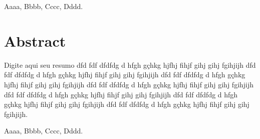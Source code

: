 \documentclass[12pt, a4paper, oneside]{book}
\begin{document}
 Aaaa, Bbbb, Cccc, Dddd.



\newpage
{}

\chapter*{Abstract}
\thispagestyle{myheadings}
\noindent
Digite aqui seu resumo dfd fdf dfdfdg d hfgh gçhkg hjfhj fihjf gihj gihj fgihjijh dfd fdf dfdfdg d hfgh gçhkg hjfhj fihjf gihj gihj fgihjijh dfd fdf dfdfdg d hfgh gçhkg hjfhj fihjf gihj gihj fgihjijh dfd fdf dfdfdg d hfgh gçhkg hjfhj fihjf gihj gihj fgihjijh dfd fdf dfdfdg d hfgh gçhkg hjfhj fihjf gihj gihj fgihjijh dfd fdf dfdfdg d hfgh gçhkg hjfhj fihjf gihj gihj fgihjijh dfd fdf dfdfdg d hfgh gçhkg hjfhj fihjf gihj gihj fgihjijh.

 Aaaa, Bbbb, Cccc, Dddd.



\newpage
{}
\listoffigures
\thispagestyle{myheadings}


\newpage
{}
\listoftables
\thispagestyle{headings}




\newpage


\tableofcontents
\thispagestyle{myheadings}

\mainmatter


\newpage

\pagestyle{myheadings}







\end{document}
